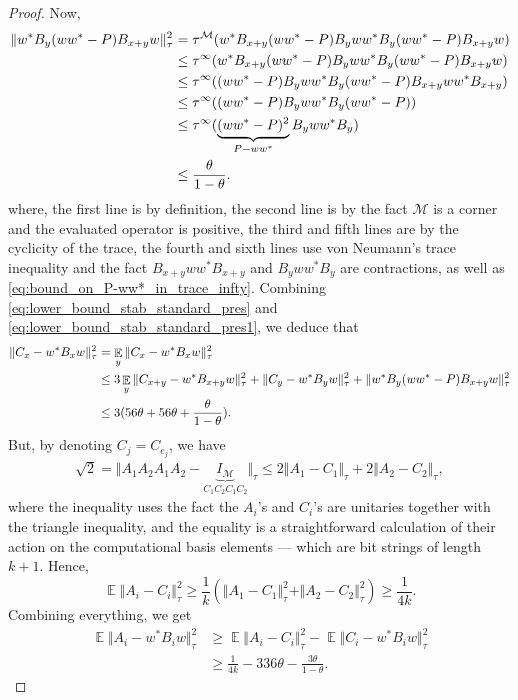 \documentclass[11pt]{article}
\theoremstyle{definition}
\newcommand{\Id}{\ensuremath{I}}
\DeclareMathOperator*{\Expectation}{\mathbb{E}}
\newcommand{\mM}{\ensuremath{\mathcal{M}}}
\begin{document}
\begin{proof}
Now, 
\begin{align}
    \Vert w^*B_y(ww^*-P)B_{x+y}w\Vert_{\tau}^2&=\tau^\mM(w^*B_{x+y}(ww^*-P)B_yww^*B_y(ww^*-P)B_{x+y}w)\notag\\
    &\leq \tau^\infty(w^*B_{x+y}(ww^*-P)B_yww^*B_y(ww^*-P)B_{x+y}w)\notag\\
     &\leq \tau^\infty((ww^*-P)B_yww^*B_y(ww^*-P)B_{x+y}ww^*B_{x+y})\notag\\
     &\leq \tau^\infty((ww^*-P)B_yww^*B_y(ww^*-P))\notag\\
     &\leq \tau^\infty(\underbrace{(ww^*-P)^2}_{P-ww^*}B_yww^*B_y)\notag\\
     &\leq \frac{\theta}{1-\theta}.\label{eq:lower_bound_stab_standard_pres1}
\end{align}
where, the first line is by definition, the second line is by the fact $\mM$ is a corner and the evaluated operator is positive, the third and fifth lines are by the cyclicity of the trace, the fourth and sixth lines use von Neumann's trace inequality and the fact $B_{x+y}ww^*B_{x+y}$ and $B_{y}ww^*B_{y}$ are contractions, as well as \eqref{eq:bound_on_P-ww*_in_trace_infty}.
Combining \eqref{eq:lower_bound_stab_standard_pres} and \eqref{eq:lower_bound_stab_standard_pres1}, we deduce that 
\begin{align}
    \Vert C_x-w^*B_xw\Vert_\tau^2&=\Expectation_{y}\Vert C_x-w^*B_xw\Vert_\tau^2\notag\\
    &\leq 3\Expectation_{y} \Vert C_{x+y}-w^*B_{x+y}w\Vert_\tau^2+\Vert C_y-w^*B_yw\Vert_\tau^2+\Vert w^*B_y(ww^*-P)B_{x+y}w\Vert_{\tau}^2\notag\\
    &\leq 3(56\theta +56\theta +\frac{\theta}{1-\theta}).
\end{align}
But, by denoting $C_j=C_{e_j}$, we have
\begin{align*}
       \sqrt{2}=\Vert A_1A_2A_1A_2-\underbrace{\Id_\mM}_{C_1C_2C_1C_2}\Vert_\tau
       \leq 2\Vert A_1-C_1\Vert_\tau+2\Vert A_2-C_2\Vert_\tau,
\end{align*}
where the inequality uses the fact the $A_i$'s and $C_i$'s are unitaries together with the triangle inequality, and the equality is a straightforward calculation of their action on the computational basis elements --- which are bit strings of length $k+1$. Hence,
\[
\Expectation \Vert A_i-C_i\Vert_\tau ^2\geq \frac{1}{k}(\Vert A_1-C_1\Vert_\tau^2+\Vert A_2-C_2\Vert_\tau^2)\geq \frac{1}{4k}.
\]
Combining everything, we get
\begin{align*}
    \Expectation \Vert A_i-w^*B_iw\Vert_\tau ^2&\geq \Expectation \Vert A_i-C_i\Vert_\tau ^2-\Expectation \Vert C_i-w^*B_iw\Vert_\tau ^2\\
    &\geq \frac{1}{4k}-336\theta-\frac{3\theta}{1-\theta}.
\end{align*}
\end{proof}
\end{document}
